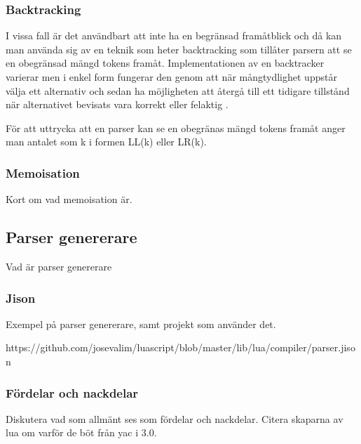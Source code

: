\subsubsection{Backtracking}

I vissa fall är det användbart att inte ha en begränsad framåtblick och då kan
man använda sig av en teknik som heter backtracking som tillåter parsern att
se en obegränsad mängd tokens framåt. Implementationen av en backtracker
varierar men i enkel form fungerar den genom att när mångtydlighet uppstår
välja ett alternativ och sedan ha möjligheten att återgå till ett tidigare
tillstånd när alternativet bevisats vara korrekt eller felaktig \citep[s. 55]{pt10}.

För att uttrycka att en parser kan se en obegränas mängd tokens framåt anger
man antalet som k i formen LL(k) eller LR(k).

\subsubsection{Memoisation}

Kort om vad memoisation är.

\subsection{Parser genererare}

Vad är parser genererare

\subsubsection{Jison}

Exempel på parser genererare, samt projekt som använder det.

https://github.com/josevalim/luascript/blob/master/lib/lua/compiler/parser.jison

\subsubsection{Fördelar och nackdelar}

Diskutera vad som allmänt ses som fördelar och nackdelar. Citera skaparna av
lua om varför de böt från yac i 3.0.

